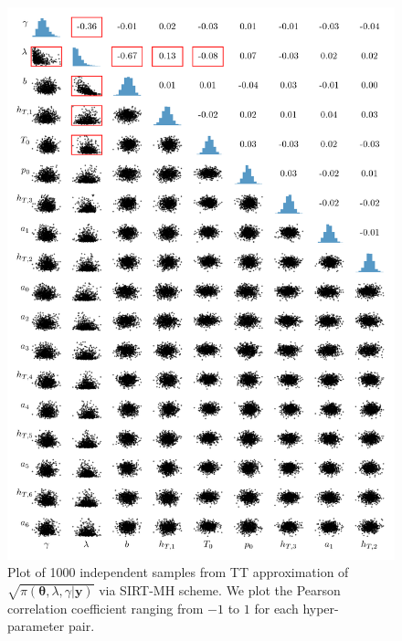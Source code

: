 \begin{figure}[h]%
	\includegraphics[]{CorrPlot.png}
	\caption[Correlation plot of samples from TT approximation]{Plot of 1000 independent samples from TT approximation of $\sqrt{\pi( \bm{\theta},\lambda,\gamma  | \bm{y})}$ via SIRT-MH scheme. We plot the Pearson correlation coefficient ranging from $-1$ to $1$ for each hyper-parameter pair.}
	\label{fig:CorrPlot}
\end{figure}
